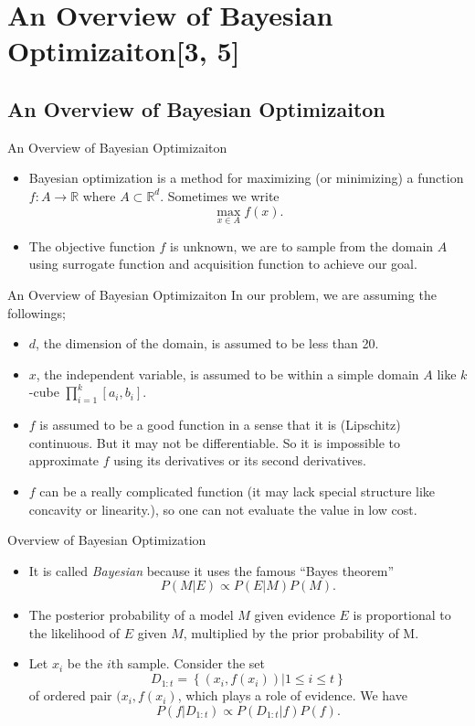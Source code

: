 \documentclass{beamer}
\begin{document}
\section{An Overview of Bayesian Optimizaiton[3, 5]}

\subsection{An Overview of Bayesian Optimizaiton}
\begin{frame}{An Overview of Bayesian Optimizaiton}
\begin{itemize}
\item
Bayesian optimization is a method for maximizing (or minimizing) a function \(f:A\to\mathbb R\) where \(A\subset\mathbb R^d\).
Sometimes we write
\[\max_{x\in A}f(x).\]
\item
The \alert{objective function} \(f\) is unknown, we are to sample from the domain \(A\) using \alert{surrogate function} and \alert{acquisition function} to achieve our goal.
\end{itemize}
\end{frame}

%
\begin{frame}{An Overview of Bayesian Optimizaiton}
In our problem, we are assuming the followings;
\begin{itemize}
\item
\(d\), the dimension of the domain, is assumed to be less than 20.
\item
\(x\), the independent variable, is assumed to be within a simple domain \(A\) like \(k\)-cube \(\prod_{i=1}^k[a_i,b_i]\).
\item
\(f\) is assumed to be a good function in a sense that it is (Lipschitz) continuous.
But it may not be differentiable.
So it is impossible to approximate \(f\) using its derivatives or its second derivatives.
\item
\(f\) can be a really complicated function (it may lack special structure like concavity or linearity.), so one can not evaluate the value in low cost.
\end{itemize}
\end{frame}

%
\begin{frame}{Overview of Bayesian Optimization}
\begin{itemize}
\item
It is called \emph{Bayesian} because it uses the famous ``Bayes theorem''
\[P(M|E)\propto P(E|M)P(M).\]
\item
The \alert{posterior} probability of a model \(M\) given \alert{evidence} \(E\) is proportional to the \alert{likelihood} of \(E\) given \(M\), multiplied by the \alert{prior} probability of M.
\item
Let \(x_i\) be the \(i\)th sample.
Consider the set
\[D_{1:t}=\left\{\left(x_i,f(x_i)\right)|1\le i\le t\right\}\]
of ordered pair \((x_i,f(x_i)\), which plays a role of evidence.
We have
\[P(f|D_{1:t})\propto P(D_{1:t}|f)P(f).\]
\end{itemize}
\end{frame}
\end{document}

